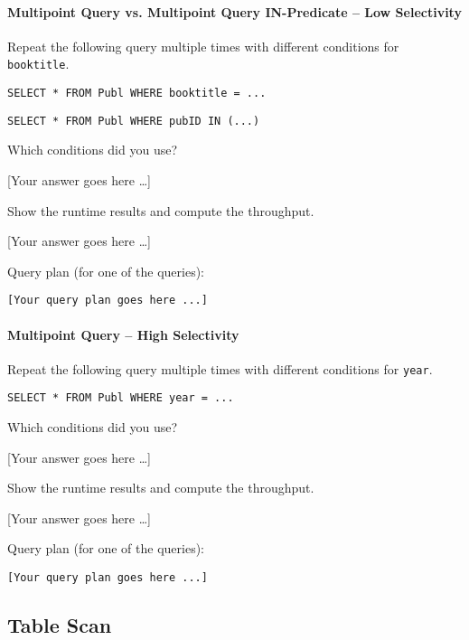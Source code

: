 \documentclass[11pt]{scrartcl}
\newcommand{\youranswerhere}{[Your answer goes here \ldots]}
\begin{document}
\paragraph{Multipoint Query vs. Multipoint Query IN-Predicate -- Low Selectivity}

Repeat the following query multiple times with different conditions for \texttt{booktitle}.

\begin{lstlisting}[style=dbtsql]
SELECT * FROM Publ WHERE booktitle = ...
\end{lstlisting}

\begin{lstlisting}[style=dbtsql]
SELECT * FROM Publ WHERE pubID IN (...)
\end{lstlisting}


Which conditions did you use?

\youranswerhere{}

Show the runtime results and compute the throughput.

\youranswerhere{}

Query plan (for one of the queries):

{\small
\parskip0pt\begin{verbatim}
[Your query plan goes here ...]
\end{verbatim}}

\paragraph{Multipoint Query -- High Selectivity}

Repeat the following query multiple times with different conditions for \texttt{year}.

\begin{lstlisting}[style=dbtsql]
SELECT * FROM Publ WHERE year = ...
\end{lstlisting}

Which conditions did you use?

\youranswerhere{}

Show the runtime results and compute the throughput.

\youranswerhere{}

Query plan (for one of the queries):

{\small
\parskip0pt\begin{verbatim}
[Your query plan goes here ...]
\end{verbatim}}

\subsection*{Table Scan}
\end{document}
